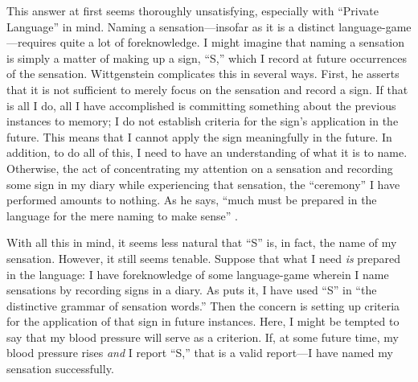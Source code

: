 \documentclass[man,12pt,natbib]{apa6}
\begin{document}
This answer at first seems thoroughly unsatisfying, especially with ``Private
Language'' in mind. Naming a sensation---insofar as it is a distinct
language-game---requires quite a lot of foreknowledge.  I might imagine that
naming a sensation is simply a matter of making up a sign, ``S,'' which I
record at future occurrences of the sensation. Wittgenstein complicates this in
several ways. First, he asserts that it is not sufficient to merely focus on
the sensation and record a sign. If that is all I do, all I have accomplished
is committing something about the previous instances to memory;
I do not establish criteria for the sign's application in the future. This
means that I cannot apply the sign meaningfully in the future.
In addition, to do all of this, I need to have an understanding of what it is
to name. Otherwise, the act of concentrating my attention on a sensation and
recording some sign in my diary while experiencing that sensation, the
``ceremony'' I have performed amounts to nothing. As he says, ``much must be
prepared in the language for the mere naming to make sense'' \citep[\S
257]{Wittgenstein53}.

With all this in mind, it seems less natural that ``S'' is, in fact, the name
of my sensation. However, it still seems tenable. Suppose that what I need
\emph{is} prepared in the language: I have foreknowledge
of some language-game wherein I name sensations by recording signs in a diary.
As \citet{McGinn97} puts it, I have used ``S'' in ``the distinctive grammar of
sensation words.'' Then the concern is setting up criteria for the application
of that sign in future instances.
%
Here, I might be tempted to say that my blood pressure
will serve as a criterion. If, at some future time, my blood pressure rises
\emph{and} I report ``S,'' that is a valid report---I have named my sensation
successfully.
\end{document}
